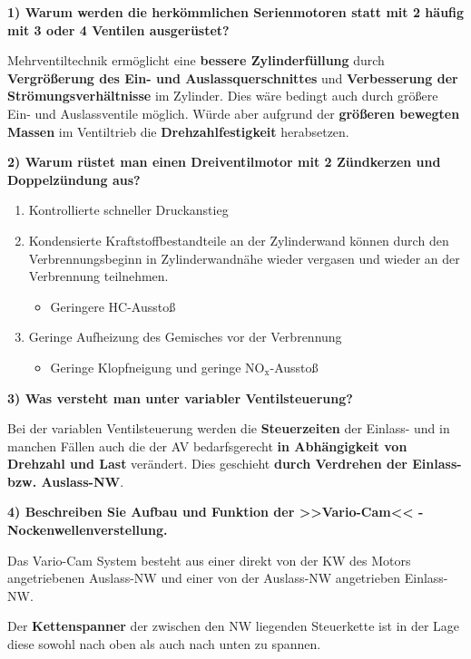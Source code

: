 \textbf{1) Warum werden die herkömmlichen Serienmotoren statt mit 2
häufig mit 3 oder 4 Ventilen ausgerüstet?}

Mehrventiltechnik ermöglicht eine \textbf{bessere Zylinderfüllung} durch
\textbf{Vergrößerung des Ein- und Auslassquerschnittes} und
\textbf{Verbesserung der Strömungsverhältnisse} im Zylinder. Dies wäre
bedingt auch durch größere Ein- und Auslassventile möglich. Würde aber
aufgrund der \textbf{größeren bewegten Massen} im Ventiltrieb die
\textbf{Drehzahlfestigkeit} herabsetzen.

\textbf{2) Warum rüstet man einen Dreiventilmotor mit 2 Zündkerzen und
Doppelzündung aus?}

\begin{enumerate}
\item
  Kontrollierte schneller Druckanstieg
\item
  Kondensierte Kraftstoffbestandteile an der Zylinderwand können durch
  den Verbrennungsbeginn in Zylinderwandnähe wieder vergasen und wieder
  an der Verbrennung teilnehmen.

  \begin{itemize}
  \item
    Geringere $\text{HC}$-Ausstoß
  \end{itemize}
\item
  Geringe Aufheizung des Gemisches vor der Verbrennung

  \begin{itemize}
  \item
    Geringe Klopfneigung und geringe $\text{NO}_\text{x}$-Ausstoß
  \end{itemize}
\end{enumerate}

\textbf{3) Was versteht man unter variabler Ventilsteuerung?}

Bei der variablen Ventilsteuerung werden die \textbf{Steuerzeiten} der
Einlass- und in manchen Fällen auch die der AV bedarfsgerecht \textbf{in
Abhängigkeit von Drehzahl und Last} verändert. Dies geschieht
\textbf{durch Verdrehen der Einlass- bzw. Auslass-NW}.

\textbf{4) Beschreiben Sie Aufbau und Funktion der >>Vario-Cam<< -
Nockenwellenverstellung.}

Das Vario-Cam System besteht aus einer direkt von der KW des Motors
angetriebenen Auslass-NW und einer von der Auslass-NW angetrieben
Einlass-NW.

Der \textbf{Kettenspanner} der zwischen den NW liegenden Steuerkette ist
in der Lage diese sowohl nach oben als auch nach unten zu spannen.

